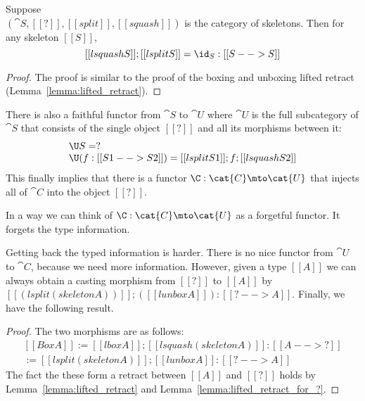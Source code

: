 \begin{lemma}
  \label{lemma:lifted_retract_for_?}
  Suppose \\$(\cat{S}, [[?]], [[split]],[[squash]])$ is the category of
  skeletons.  Then for any skeleton $[[S]]$,
  \[
    [[lsquash S]];[[lsplit S]] = \id_S : [[S --> S]]
  \]
\end{lemma}
\begin{proof}
  The proof is similar to the proof of the boxing and unboxing lifted
  retract (Lemma~\ref{lemma:lifted_retract}).
\end{proof}
There is also a faithful functor from $\cat{S}$ to $\cat{U}$ where
$\cat{U}$ is the full subcategory of $\cat{S}$ that consists of the
single object $[[?]]$ and all its morphisms between it:
\[
\begin{array}{lll}
  \U S = ?\\
  \U (f : [[S1 --> S2]]) = [[lsplit S1]];f;[[lsquash S2]]
\end{array}
\]
This finally implies that there is a functor $\C : \cat{C} \mto
\cat{U}$ that injects all of $\cat{C}$ into the object $[[?]]$.
\noindent
In a way we can think of $\C :  \mto {}$ as a forgetful
functor.  It forgets the type information.

Getting back the typed information is harder.  There is no nice
functor from $$ to $$, because we need more information.
However, given a type $[[A]]$ we can always obtain a casting morphism
from $[[?]]$ to $[[A]]$ by $[[(lsplit (skeleton A))]];([[lunbox A]]) :
[[? --> A]]$.  Finally, we have the following result.
\begin{proof}
  The two morphisms are as follows:
  \[
  \begin{array}{lll}
    [[Box A]] := [[lbox A]];[[lsquash (skeleton A)]] : [[A --> ?]]\\
    [[Unbox A]] := [[lsplit (skeleton A)]];[[lunbox A]] : [[? --> A]]
  \end{array}
  \]
  The fact the these form a retract between $[[A]]$ and $[[?]]$ holds
  by Lemma~\ref{lemma:lifted_retract} and
  Lemma~\ref{lemma:lifted_retract_for_?}.
\end{proof}

